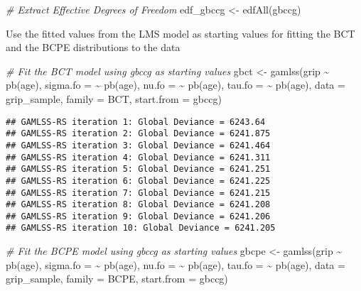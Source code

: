 \documentclass[
]{article}
\newenvironment{Shaded}{\begin{snugshade}}{\end{snugshade}}
\newcommand{\AttributeTok}[1]{\textcolor[rgb]{0.77,0.63,0.00}{#1}}
\newcommand{\CommentTok}[1]{\textcolor[rgb]{0.56,0.35,0.01}{\textit{#1}}}
\newcommand{\FunctionTok}[1]{\textcolor[rgb]{0.00,0.00,0.00}{#1}}
\newcommand{\NormalTok}[1]{#1}
\newcommand{\OtherTok}[1]{\textcolor[rgb]{0.56,0.35,0.01}{#1}}
\newcommand{\SpecialCharTok}[1]{\textcolor[rgb]{0.00,0.00,0.00}{#1}}
\begin{document}
\begin{Shaded}
\begin{Highlighting}[]
\CommentTok{\# Extract Effective Degrees of Freedom}
\NormalTok{edf\_gbccg }\OtherTok{\textless{}{-}} \FunctionTok{edfAll}\NormalTok{(gbccg)}
\end{Highlighting}
\end{Shaded}

Use the fitted values from the LMS model as starting values for fitting
the BCT and the BCPE distributions to the data

\begin{Shaded}
\begin{Highlighting}[]
\CommentTok{\# Fit the BCT model using gbccg as starting values}
\NormalTok{gbct }\OtherTok{\textless{}{-}} \FunctionTok{gamlss}\NormalTok{(grip }\SpecialCharTok{\textasciitilde{}} \FunctionTok{pb}\NormalTok{(age),}
               \AttributeTok{sigma.fo =} \SpecialCharTok{\textasciitilde{}} \FunctionTok{pb}\NormalTok{(age),}
               \AttributeTok{nu.fo =} \SpecialCharTok{\textasciitilde{}} \FunctionTok{pb}\NormalTok{(age),}
               \AttributeTok{tau.fo =} \SpecialCharTok{\textasciitilde{}} \FunctionTok{pb}\NormalTok{(age),}
               \AttributeTok{data =}\NormalTok{ grip\_sample,}
               \AttributeTok{family =}\NormalTok{ BCT,}
               \AttributeTok{start.from =}\NormalTok{ gbccg)}
\end{Highlighting}
\end{Shaded}

\begin{verbatim}
## GAMLSS-RS iteration 1: Global Deviance = 6243.64 
## GAMLSS-RS iteration 2: Global Deviance = 6241.875 
## GAMLSS-RS iteration 3: Global Deviance = 6241.464 
## GAMLSS-RS iteration 4: Global Deviance = 6241.311 
## GAMLSS-RS iteration 5: Global Deviance = 6241.251 
## GAMLSS-RS iteration 6: Global Deviance = 6241.225 
## GAMLSS-RS iteration 7: Global Deviance = 6241.215 
## GAMLSS-RS iteration 8: Global Deviance = 6241.208 
## GAMLSS-RS iteration 9: Global Deviance = 6241.206 
## GAMLSS-RS iteration 10: Global Deviance = 6241.205
\end{verbatim}

\begin{Shaded}
\begin{Highlighting}[]
\CommentTok{\# Fit the BCPE model using gbccg as starting values}
\NormalTok{gbcpe }\OtherTok{\textless{}{-}} \FunctionTok{gamlss}\NormalTok{(grip }\SpecialCharTok{\textasciitilde{}} \FunctionTok{pb}\NormalTok{(age),}
                \AttributeTok{sigma.fo =} \SpecialCharTok{\textasciitilde{}} \FunctionTok{pb}\NormalTok{(age),}
                \AttributeTok{nu.fo =} \SpecialCharTok{\textasciitilde{}} \FunctionTok{pb}\NormalTok{(age),}
                \AttributeTok{tau.fo =} \SpecialCharTok{\textasciitilde{}} \FunctionTok{pb}\NormalTok{(age),}
                \AttributeTok{data =}\NormalTok{ grip\_sample,}
                \AttributeTok{family =}\NormalTok{ BCPE,}
                \AttributeTok{start.from =}\NormalTok{ gbccg)}
\end{Highlighting}
\end{Shaded}
\end{document}
